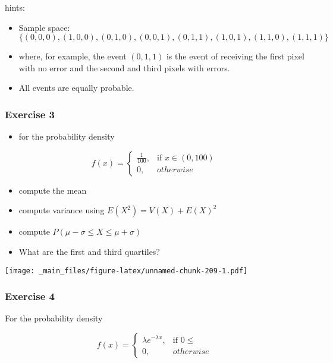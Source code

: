 \documentclass[
]{book}
\providecommand{\tightlist}{%
  \setlength{\itemsep}{0pt}\setlength{\parskip}{0pt}}
\begin{document}
hints:

\begin{itemize}
\item
  Sample space: \(\{(0,0,0), (1,0,0), (0,1,0), (0,0,1), (0,1,1), (1,0,1), (1,1,0), (1,1,1)\}\)
\item
  where, for example, the event \((0,1,1)\) is the event of receiving the first pixel with no error and the second and third pixels with errors.
\item
  All events are equally probable.
\end{itemize}

\hypertarget{exercise-3-1}{%
\subsubsection{Exercise 3}\label{exercise-3-1}}

\begin{itemize}
\tightlist
\item
  for the probability density
\end{itemize}

\[
    f(x)= 
\begin{cases}
    \frac{1}{100},& \text{if } x\in (0,100)\\
    0,& otherwise 
\end{cases}
\]

\begin{itemize}
\tightlist
\item
  compute the mean
\item
  compute variance using \(E(X^2)=V(X)+E(X)^2\)
\item
  compute \(P(\mu-\sigma\leq X \leq \mu+\sigma)\)
\item
  What are the first and third quartiles?
\end{itemize}

\texttt{[image: \_main\_files/figure-latex/unnamed-chunk-209-1.pdf]}

\hypertarget{exercise-4-1}{%
\subsubsection{Exercise 4}\label{exercise-4-1}}

For the probability density

\[
    f(x)= 
\begin{cases}
    \lambda e^{-\lambda x},& \text{if } 0 \leq\\
    0,& otherwise 
\end{cases}
\]
\end{document}
